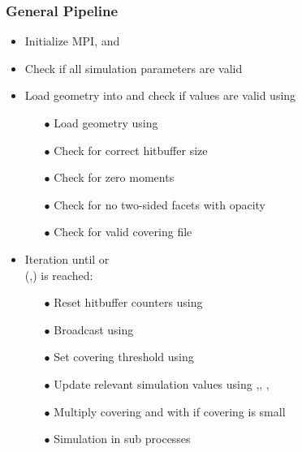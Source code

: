 \subsubsection{General Pipeline}
\begin{itemize}[noitemsep,topsep=0pt, partopsep=0pt]
\item Initialize MPI,  and 
\item Check if all simulation parameters are valid
\item Load geometry into  and check if values are valid using 
	\begin{itemize}[noitemsep,topsep=0pt, partopsep=0pt]
		\item[$\bullet$] Load geometry using 
		\item[$\bullet$] Check for correct hitbuffer size
		\item[$\bullet$] Check for zero moments
		\item[$\bullet$] Check for no two-sided facets with opacity
		\item[$\bullet$] Check for valid covering file
	\end{itemize}
\item Iteration until  or\\  (,) is reached: \smallskip
	\begin{itemize}[noitemsep,topsep=0pt, partopsep=0pt]
	\item[$\bullet$] Reset hitbuffer counters using 
	\item[$\bullet$] Broadcast  using 
	\item[$\bullet$] Set covering threshold  using 
	\item[$\bullet$] Update relevant simulation values using ,\linebreak[4] , , 
	\item[$\bullet$] Multiply covering and  with  if covering is small
	\item[$\bullet$] Simulation in sub processes

\end{itemize}
\end{itemize}
